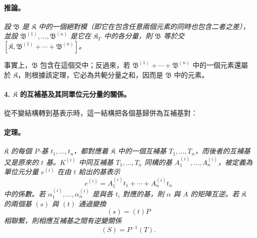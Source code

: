 \documentclass[11pt]{article}
\begin{document}
\paragraph{推論。}
\emph{設 $\mathfrak B$ 是 $\mathfrak K$ 中的一個絕對模（即它在包含任意兩個元素的同時也包含二者之差），並設 $\mathfrak B^{(1)},\ldots,\mathfrak B^{(n)}$ 是它在 $\mathfrak K_\Gamma$ 中的各分量，則 $\mathfrak B$ 等於交 $[\mathfrak K,\mathfrak B^{(1)}+\cdots+\mathfrak B^{(n)}]$。}

事實上，$\mathfrak B$ 包含在這個交中；反過來，若 $\mathfrak B^{(1)}+\cdots+\mathfrak B^{(n)}$ 中的一個元素還屬於 $\mathfrak K$，則根據該定理，它必為共軛分量之和，因而是 $\mathfrak B$ 中的元素。

\paragraph{4. $\mathfrak K$ 的互補基及其同單位元分量的關係。}
從不變結構轉到基表示時，這一結構把各個基歸併為互補基對：

\paragraph{定理。}
\emph{$\mathfrak K$ 的每個 $P$-基 $t_1,\ldots,t_n$，都對應着 $\mathfrak K$ 中的一個互補基 $T_1,\ldots,T_n$，而後者的互補基又是原來的 $t$ 基。$K^{(i)}$ 中同互補基 $T_1,\ldots,T_n$ 同構的基 $A_1^{(i)},\ldots,A_n^{(i)}$，被定義為單位元分量 $e^{(i)}$ 在由 $t$ 給出的基表示
\[
e^{(i)}=A_1^{(i)}t_1+\cdots+A_n^{(i)}t_n
\]
中的係數。若 $\alpha_1^{(i)},\ldots,\alpha_n^{(i)}$ 是與各 $t_i$ 對應的基，則 $\alpha$ 與 $A$ 的矩陣互逆。若 $\mathfrak K$ 的兩個基 $(s)$ 與 $(t)$ 通過變換
\[
(s)=(t)P
\]
相聯繫，則相應互補基之間有逆變關係
\[
(S)=P^{-1}(T).
\]}
\end{document}
